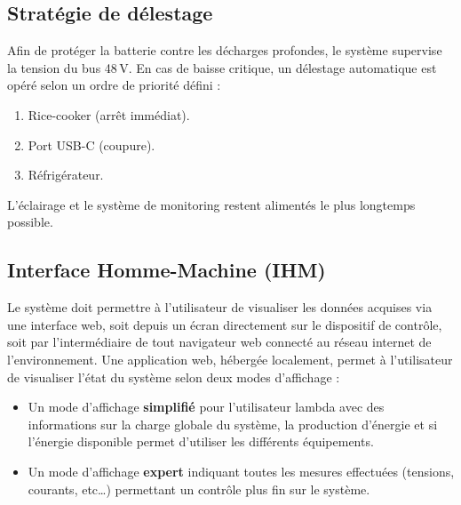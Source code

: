 \subsection{Stratégie de délestage}
Afin de protéger la batterie contre les décharges profondes, le système supervise la tension du bus 48\,V. En cas de baisse critique, un délestage automatique est opéré selon un ordre de priorité défini :
\begin{enumerate}
    \item Rice-cooker (arrêt immédiat).
    \item Port USB-C (coupure).
    \item Réfrigérateur.
\end{enumerate}
L'éclairage et le système de monitoring restent alimentés le plus longtemps possible.

\subsection{Interface Homme-Machine (IHM)}
Le système doit permettre à l’utilisateur de visualiser les données acquises via une interface web, soit depuis un écran directement sur le dispositif de contrôle, soit par l’intermédiaire de tout navigateur web connecté au réseau internet de l’environnement.
Une application web, hébergée localement, permet à l'utilisateur de visualiser l'état du système selon deux modes d’affichage :



\begin{itemize}
    \item Un mode d’affichage \textbf{simplifié} pour l'utilisateur lambda avec des informations sur la charge globale du système, la production d’énergie et si l’énergie disponible permet d’utiliser les différents équipements.
    \item Un mode d’affichage \textbf{expert} indiquant toutes les mesures effectuées (tensions, courants, etc…) permettant un contrôle plus fin sur le système.
\end{itemize}